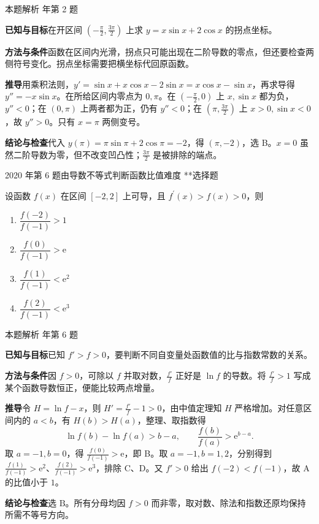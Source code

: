 \documentclass[UTF8,zihao=-4,fontset=fandol]{ctexart}
\newenvironment{abcd}{\begin{enumerate}[label=\textup{(\Alph*)},leftmargin=2.3em,itemsep=1pt,topsep=4pt,parsep=1pt]}{\end{enumerate}}
\newcommand{\choices}[4]{%
  \begin{abcd}
    \item #1
    \item #2
    \item #3
    \item #4
  \end{abcd}}
\newcounter{BankQuestion}
\newcommand{\QuestionPage}[7]{%
  \stepcounter{BankQuestion}%
  \par\noindent\begin{minipage}{\linewidth}
  \raggedright
  {\small\textcolor{black!60}{#3\quad #5\quad 难度 #7}\hfill\textcolor{accent}{#2}}\par\smallskip}
\newcommand{\QuestionEnd}{\end{minipage}\par\medskip}
\newcommand{\QuestionPage}[7]{%
  \clearpage
  \stepcounter{BankQuestion}%
  {\small\textcolor{accent}{#1\hfill #2}}\par\medskip
  {\small\textcolor{black!60}{#3\quad #5\quad 难度 #7\hfill \arabic{BankQuestion} / 234}}\par\vspace{9bp}}
\newcommand{\QuestionEnd}{}
\newenvironment{QuestionSolution}[1]{%
  \clearpage
  {\small\textcolor{black!60}{本题解析\quad #1}}\par\medskip
}{\par\clearpage}
\begin{document}
\begin{QuestionSolution}{2019 年第 2 题}
\textbf{已知与目标}\quad 在开区间 \((-\frac\pi2,\frac{3\pi}2)\) 上求 \(y=x\sin x+2\cos x\) 的拐点坐标。

\textbf{方法与条件}\quad 函数在区间内光滑，拐点只可能出现在二阶导数的零点，但还要检查两侧符号变化。拐点坐标需要把横坐标代回原函数。

\textbf{推导}\quad 用乘积法则，\(y'=\sin x+x\cos x-2\sin x=x\cos x-\sin x\)，再求导得 \(y''=-x\sin x\)。在所给区间内零点为 \(0,\pi\)。在 \((-\frac\pi2,0)\) 上 \(x,\sin x\) 都为负，\(y''<0\)；在 \((0,\pi)\) 上两者都为正，仍有 \(y''<0\)；在 \((\pi,\frac{3\pi}2)\) 上 \(x>0,\sin x<0\)，故 \(y''>0\)。只有 \(x=\pi\) 两侧变号。

\textbf{结论与检查}\quad 代入 \(y(\pi)=\pi\sin\pi+2\cos\pi=-2\)，得 \(\boxed{(\pi,-2)}\)，选 B。\(x=0\) 虽然二阶导数为零，但不改变凹凸性；\(\frac{3\pi}2\) 是被排除的端点。
\end{QuestionSolution}

\QuestionPage{2.6 函数性态的研究}{选择题}{2020 年第 6 题}{1}{由导数不等式判断函数比值}{111 / 234}{**}
设函数 \(f\left( x \right)\) 在区间 \(\left[ -2,2 \right]\) 上可导，且 \(f^{\prime}\left( x \right) > f\left( x \right) > 0\)，则
\choices{\(\dfrac{f\left( -2 \right)}{f\left( -1 \right)} > 1\)}{\(\dfrac{f\left( 0 \right)}{f\left( -1 \right)} > \mathrm{e}\)}{\(\dfrac{f\left( 1 \right)}{f\left( -1 \right)} < \mathrm{e}^{2}\)}{\(\dfrac{f\left( 2 \right)}{f\left( -1 \right)} < \mathrm{e}^{3}\)}
\QuestionEnd

\begin{QuestionSolution}{2020 年第 6 题}
\textbf{已知与目标}\quad 已知 \(f'>f>0\)，要判断不同自变量处函数值的比与指数常数的关系。

\textbf{方法与条件}\quad 因 \(f>0\)，可除以 \(f\) 并取对数，\(\frac{f'}f\) 正好是 \(\ln f\) 的导数。将 \(\frac{f'}f>1\) 写成某个函数导数恒正，便能比较两点增量。

\textbf{推导}\quad 令 \(H=\ln f-x\)，则 \(H'=\frac{f'}f-1>0\)，由中值定理知 \(H\) 严格增加。对任意区间内的 \(a<b\)，有 \(H(b)>H(a)\)，整理、取指数得
\[
\ln f(b)-\ln f(a)>b-a,
\qquad \frac{f(b)}{f(a)}>\mathrm{e}^{b-a}.
\]
取 \(a=-1,b=0\)，得 \(\frac{f(0)}{f(-1)}>\mathrm e\)，即 B。取 \(a=-1,b=1,2\)，分别得到 \(\frac{f(1)}{f(-1)}>\mathrm e^2\)、\(\frac{f(2)}{f(-1)}>\mathrm e^3\)，排除 C、D。又 \(f'>0\) 给出 \(f(-2)<f(-1)\)，故 A 的比值小于 \(1\)。

\textbf{结论与检查}\quad 选 \(\boxed{\mathrm B}\)。所有分母均因 \(f>0\) 而非零，取对数、除法和指数还原均保持所需不等号方向。
\end{QuestionSolution}
\end{document}
